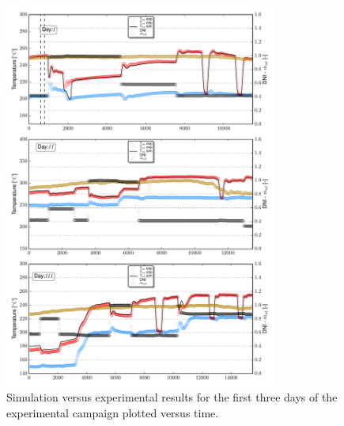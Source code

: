 \documentclass[final,3p,times,review]{elsarticle}
\begin{document}
\begin{figure}[h!]
\centering
\includegraphics[width=0.8\textwidth]{Figures/_FirstThreeDays.pdf}
\caption{Simulation versus experimental results for the first three days of the experimental campaign plotted versus time. }
\label{fig:SF_ModRes_First3Days}
\end{figure}
%
%
\end{document}
